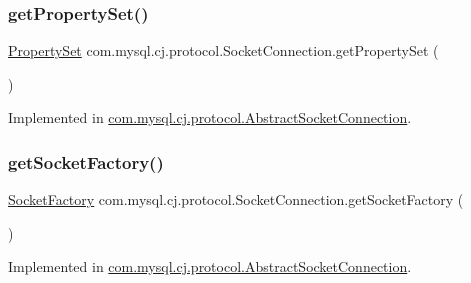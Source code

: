 \subsubsection{\texorpdfstring{get\+Property\+Set()}{getPropertySet()}}
{\footnotesize\ttfamily \mbox{\hyperlink{interfacecom_1_1mysql_1_1cj_1_1conf_1_1_property_set}{Property\+Set}} com.\+mysql.\+cj.\+protocol.\+Socket\+Connection.\+get\+Property\+Set (\begin{DoxyParamCaption}{ }\end{DoxyParamCaption})}



Implemented in \mbox{\hyperlink{classcom_1_1mysql_1_1cj_1_1protocol_1_1_abstract_socket_connection_a348b688bc6dc34862651adaf6b2f057f}{com.\+mysql.\+cj.\+protocol.\+Abstract\+Socket\+Connection}}.

\mbox{\label{interfacecom_1_1mysql_1_1cj_1_1protocol_1_1_socket_connection_a86b6e540d663ad7945c0a69b53cebe66}} 
\subsubsection{\texorpdfstring{get\+Socket\+Factory()}{getSocketFactory()}}
{\footnotesize\ttfamily \mbox{\hyperlink{interfacecom_1_1mysql_1_1cj_1_1protocol_1_1_socket_factory}{Socket\+Factory}} com.\+mysql.\+cj.\+protocol.\+Socket\+Connection.\+get\+Socket\+Factory (\begin{DoxyParamCaption}{ }\end{DoxyParamCaption})}



Implemented in \mbox{\hyperlink{classcom_1_1mysql_1_1cj_1_1protocol_1_1_abstract_socket_connection_a1f81e05b320d5aad420032fcfd74d9a3}{com.\+mysql.\+cj.\+protocol.\+Abstract\+Socket\+Connection}}.

\mbox{\label{interfacecom_1_1mysql_1_1cj_1_1protocol_1_1_socket_connection_a84f9cb74e6648f4c40650186e5a07c5c}} 
